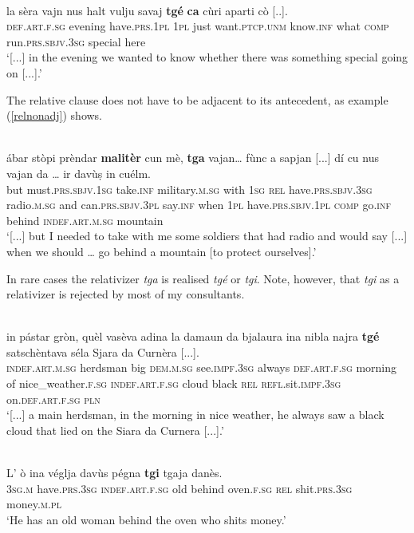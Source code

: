 \ea
\label{}
\\
\gll [...] la sèra vajn nus halt vulju savaj \textbf{tgé} \textbf{ca} cùri aparti cò [..].\\
{} \textsc{def.art.f.sg} evening have.\textsc{prs.1pl} \textsc{1pl} just want.\textsc{ptcp.unm} know.\textsc{inf} what \textsc{comp} run.\textsc{prs.sbjv.3sg} special here\\
\glt `[...] in the evening we wanted to know whether there was something special going on [...].'
\z

The relative clause does not have to be adjacent to its antecedent, as example (\ref{relnonadj}) shows.

\ea
\label{relnonadj}
\\
\gll  [...] ábar stòpi prèndar \textbf{malitèr} cun mè, \textbf{tga} vajan… fùnc a sapjan [...] dí cu nus vajan da … ir davùṣ in cuélm.\\
{} but must.\textsc{prs.sbjv.1sg} take.\textsc{inf} military.\textsc{m.sg} with \textsc{1sg} \textsc{rel} have.\textsc{prs.sbjv.3sg} radio.\textsc{m.sg} and can.\textsc{prs.sbjv.3pl} {} say.\textsc{inf} when \textsc{1pl} have.\textsc{prs.sbjv.1pl} \textsc{comp} {} go.\textsc{inf} behind \textsc{indef.art.m.sg} mountain\\
\glt `[...] but I needed to take with me some soldiers that had radio and would say [...] when we should … go behind a mountain [to protect ourselves].'
\z

In rare cases the relativizer \textit{tga} is realised \textit{tgé} or \textit{tgi}. Note, however, that \textit{tgi} as a relativizer is rejected by most of my consultants.

\ea
\label{}
\\
\gll [...] in pástar gròn, quèl vasèva adina la damaun da bjalaura ina nibla najra \textbf{tgé} satschèntava séla Sjara da Curnèra [...].\\
{} \textsc{indef.art.m.sg} herdsman big \textsc{dem.m.sg} see.\textsc{impf.3sg} always \textsc{def.art.f.sg} morning of nice\_weather.\textsc{f.sg} \textsc{indef.art.f.sg} cloud black \textsc{rel} \textsc{refl}.sit.\textsc{impf.3sg} on.\textsc{def.art.f.sg} \textsc{pln}\\
\glt `[...] a main herdsman, in the morning in nice weather, he always saw a black cloud that lied on the Siara da Curnera [...].'
\z

\ea
\label{}
\\
\gll L' ò ina véglja davùs pégna \textbf{tgi} tgaja danès.\\
\textsc{3sg.m} have.\textsc{prs.3sg} \textsc{indef.art.f.sg} old behind oven.\textsc{f.sg} \textsc{rel} shit.\textsc{prs.3sg} money.\textsc{m.pl}\\
\glt `He has an old woman behind the oven who shits money.'
\z

